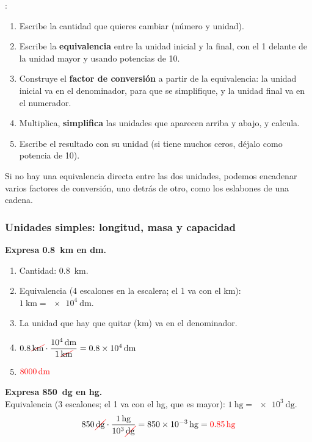 :
\begin{enumerate}[label=\numberballmDarkTeal]
    \item Escribe la cantidad que quieres cambiar (número y unidad).
    \item Escribe la \textbf{equivalencia} entre la unidad inicial y la final, con el 1 delante de la unidad mayor y usando potencias de 10.
    \item Construye el \textbf{factor de conversión} a partir de la equivalencia: la unidad inicial va en el denominador, para que se simplifique, y la unidad final va en el numerador.
    \item Multiplica, \textbf{simplifica} las unidades que aparecen arriba y abajo, y calcula.
    \item Escribe el resultado con su unidad (si tiene muchos ceros, déjalo como potencia de 10).
\end{enumerate}

Si no hay una equivalencia directa entre las dos unidades, podemos encadenar varios factores de conversión, uno detrás de otro, como los eslabones de una cadena.


\subsubsection{Unidades simples: longitud, masa y capacidad}

\begin{example}
    \textbf{Expresa \qty{0.8}{\km} en \unit{\dm}.}
    \begin{enumerate}[label=\numberballmDarkTeal]
        \item Cantidad: \qty{0.8}{\km}.
        \item Equivalencia (4 escalones en la escalera; el 1 va con el \unit{\km}): \(\qty{1}{\km} = \qty{e4}{\dm}\).
        \item La unidad que hay que quitar (\unit{\km}) va en el denominador.
        \item \(
            \num{0.8}\,\cancelunit{\km} \cdot \dfrac{\qty{e4}{\dm}}{1\,\cancelunit{\km}} = \qty{0.8e4}{\dm}
        \)
        \item \(\textcolor{red}{\qty{8000}{\dm}}\)
    \end{enumerate}
\end{example}

\begin{example}
    \textbf{Expresa \qty{850}{\deci\gram} en \unit{\hecto\gram}.} \\
    Equivalencia (3 escalones; el 1 va con el \unit{\hecto\gram}, que es mayor): \(\qty{1}{\hecto\gram} = \qty{e3}{\deci\gram}\).
    \begin{equation*}
        \num{850}\,\cancelunit{\deci\gram} \cdot \dfrac{\qty{1}{\hecto\gram}}{\num{e3}\,\cancelunit{\deci\gram}} = \qty{850e-3}{\hecto\gram} = \textcolor{red}{\qty{0.85}{\hecto\gram}}
    \end{equation*}
\end{example}

